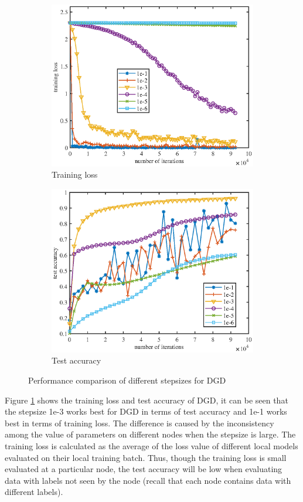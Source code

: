 \documentclass{article} %
\begin{document}
\begin{figure}[htbp]
\centering
	\begin{subfigure}{.45\textwidth}
	\centering
	\includegraphics[width=.9\textwidth]{figures/sgd_train.eps}
	\caption{\small Training loss}
	\end{subfigure}
\begin{subfigure}{.45\textwidth}
	\centering
		\includegraphics[width=.9\textwidth]{figures/sgd_test.eps}
	\caption{\small  Test accuracy}
	\end{subfigure}
	\caption{Performance comparison of different stepsizes for DGD}
	\label{fig: sgd_curve}
\end{figure}

Figure \ref{fig: sgd_curve} shows the training loss and test accuracy of DGD, it can be seen that the stepsize 1e-3 works best for DGD in terms of test accuracy and 1e-1 works best in terms of training loss. The difference is caused by the inconsistency among the value of parameters on different nodes when the stepsize is large. The training loss is calculated as the average of the loss value of different local models evaluated on their local training batch. Thus, though the training loss is small evaluated at a particular node, the test accuracy will be low when evaluating data with labels not seen by the node (recall that each node contains data with different labels).
\end{document}
